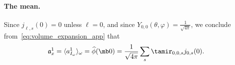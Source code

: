 \documentclass[9pt,twocolumn,twoside,lineno]{pnas-new}
\begin{document}
\paragraph{The mean.}

Since $j_{\ell,s}(0) = 0$ unless $\ell=0$, and since
$Y_{0,0}(\theta,\varphi) = \frac{1}{\sqrt{4\pi}}$, we conclude from~\eqref{eq:volume_expansion_app} that
\begin{equation} \label{eq:ac_1_prolates}
\mathfrak{a}_x^1 = \langle
a^1_{I_{\omega}}\rangle_{\omega}  = \widehat  \phi(\mb 0) = \frac{1}{\sqrt{4\pi}}\sum_s\tamir_{0,0,s}j_{0,s}(0).
\end{equation}




\end{document}

